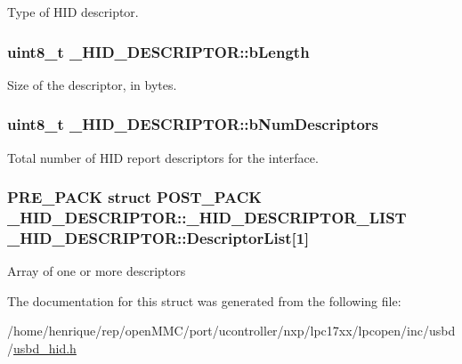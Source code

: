 Type of H\-I\-D descriptor. \hypertarget{struct__HID__DESCRIPTOR_abec52caed8ae7c6265e6aa9fccfec729}{
\subsubsection[{b\-Length}]{\setlength{\rightskip}{0pt plus 5cm}uint8\-\_\-t \-\_\-\-H\-I\-D\-\_\-\-D\-E\-S\-C\-R\-I\-P\-T\-O\-R\-::b\-Length}}\label{struct__HID__DESCRIPTOR_abec52caed8ae7c6265e6aa9fccfec729}
Size of the descriptor, in bytes. \hypertarget{struct__HID__DESCRIPTOR_a9613890e6d0ae78428807a72beb64d74}{
\subsubsection[{b\-Num\-Descriptors}]{\setlength{\rightskip}{0pt plus 5cm}uint8\-\_\-t \-\_\-\-H\-I\-D\-\_\-\-D\-E\-S\-C\-R\-I\-P\-T\-O\-R\-::b\-Num\-Descriptors}}\label{struct__HID__DESCRIPTOR_a9613890e6d0ae78428807a72beb64d74}
Total number of H\-I\-D report descriptors for the interface. \hypertarget{struct__HID__DESCRIPTOR_ab147b0fb12a4d62db59bb05846a48161}{
\subsubsection[{Descriptor\-List}]{\setlength{\rightskip}{0pt plus 5cm}P\-R\-E\-\_\-\-P\-A\-C\-K struct P\-O\-S\-T\-\_\-\-P\-A\-C\-K {\bf \-\_\-\-H\-I\-D\-\_\-\-D\-E\-S\-C\-R\-I\-P\-T\-O\-R\-::\-\_\-\-H\-I\-D\-\_\-\-D\-E\-S\-C\-R\-I\-P\-T\-O\-R\-\_\-\-L\-I\-S\-T}  \-\_\-\-H\-I\-D\-\_\-\-D\-E\-S\-C\-R\-I\-P\-T\-O\-R\-::\-Descriptor\-List\mbox{[}1\mbox{]}}}\label{struct__HID__DESCRIPTOR_ab147b0fb12a4d62db59bb05846a48161}
Array of one or more descriptors 

The documentation for this struct was generated from the following file\-:\begin{DoxyCompactItemize}
\item 
/home/henrique/rep/open\-M\-M\-C/port/ucontroller/nxp/lpc17xx/lpcopen/inc/usbd/\hyperlink{usbd__hid_8h}{usbd\-\_\-hid.\-h}\end{DoxyCompactItemize}
